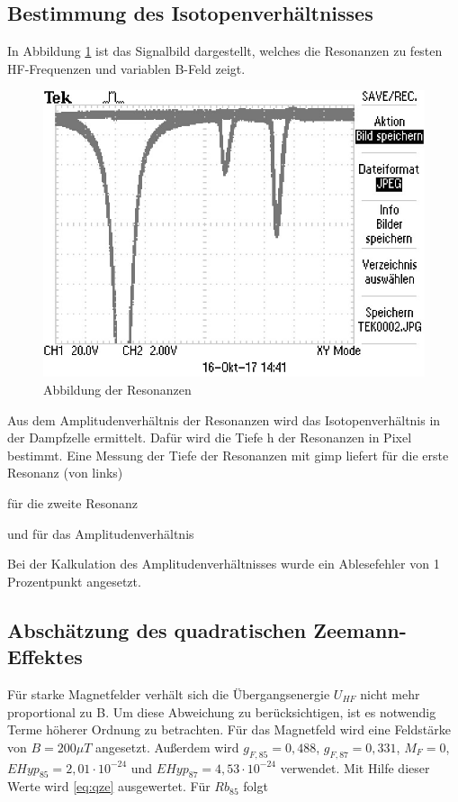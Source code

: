 \subsection{Bestimmung des Isotopenverhältnisses}
In Abbildung \ref{resonanz} ist das Signalbild dargestellt, welches die Resonanzen zu festen
HF-Frequenzen und variablen B-Feld zeigt.

\begin{figure}[h]
\centering
\includegraphics[scale=0.8]{img/TEK0002.JPG}
\caption{Abbildung der Resonanzen}
\label{resonanz}
\end{figure}


Aus dem Amplitudenverhältnis der Resonanzen wird das Isotopenverhältnis in der
Dampfzelle ermittelt. Dafür wird die Tiefe h der Resonanzen in Pixel bestimmt.
Eine Messung der Tiefe der Resonanzen mit gimp liefert für die erste Resonanz (von links)



für die zweite Resonanz



und für das Amplitudenverhältnis



Bei der Kalkulation des Amplitudenverhältnisses wurde ein Ablesefehler von 1 Prozentpunkt
angesetzt.

\subsection{Abschätzung des quadratischen Zeemann-Effektes}
Für starke Magnetfelder verhält sich die Übergangsenergie $U_{HF}$ nicht mehr proportional zu B. Um diese Abweichung zu berücksichtigen, ist es notwendig Terme höherer Ordnung zu betrachten.
Für das Magnetfeld wird eine Feldstärke von $B = 200 \mu T$ angesetzt. Außerdem wird $g_{F,85} = 0,488$, $g_{F,87} = 0,331$, $M_F = 0$, 
$EHyp_{85} = 2,01 \cdot 10^{-24}$ und $EHyp_{87} = 4,53 \cdot 10^{-24}$ \cite{FP} verwendet. Mit Hilfe dieser Werte wird \ref{eq:qze} ausgewertet. Für $Rb_{85}$ folgt

